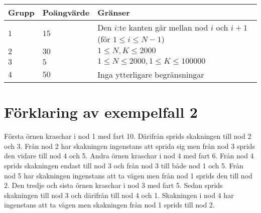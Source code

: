 \noindent
\begin{tabular}{| l | l | l |}
  \hline
  Grupp & Poängvärde & Gränser \\ \hline
  $1$    & $15$       &  Den $i$:te kanten går mellan nod $i$ och $i+1$ (för $1 \le i \le N-1$) \\ \hline 
  $2$    & $30$       &  $1 \le N,K \le 2000$ \\ \hline
  $3$    & $5$        &  $1 \le N \le 2000, 1 \le K \le 100000 $ \\ \hline
  $4$    & $50$       &  Inga ytterligare begränsningar \\ \hline
\end{tabular}

\section*{Förklaring av exempelfall 2}
Första örnen kraschar i nod 1 med fart 10. Därifrån sprids skakningen till nod 2 och 3. Från nod 2 har skakningen ingenstans att sprida sig men från nod 3 sprids den vidare till nod 4 och 5.
Andra örnen kraschar i nod 4 med fart 6. Från nod 4 sprids skakningen endast till nod 3 och från nod 3 till både nod 1 och 5. Från nod 5 har skakningen ingenstans att ta vägen men från nod 1 sprids den till nod 2.
Den tredje och sista örnen kraschar i nod 3 med fart 5. Sedan sprids skakningen till nod 3 och därifrån till nod 4 och 1. Skakningen i nod 4 har ingenstans att ta vägen men skakningen från nod 1 sprids till nod 2.
